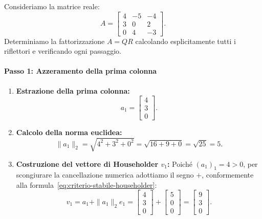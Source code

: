 \begin{example}
Consideriamo la matrice reale:
\begin{equation}
    A = \begin{bmatrix} 
    4 & -5 & -4 \\ 
    3 & 0 & 2 \\ 
    0 & 4 & -3 
    \end{bmatrix}.
\end{equation}
Determiniamo la fattorizzazione $A = QR$ calcolando esplicitamente tutti i riflettori e verificando ogni passaggio.

\paragraph{Passo 1: Azzeramento della prima colonna}
\begin{enumerate}
    \item \textbf{Estrazione della prima colonna:}
    \begin{equation}
        a_1 = \begin{bmatrix} 4 \\ 3 \\ 0 \end{bmatrix}.
    \end{equation}
    \item \textbf{Calcolo della norma euclidea:}
    \begin{equation}
        \|a_1\|_2 = \sqrt{4^2 + 3^2 + 0^2} = \sqrt{16 + 9 + 0} = \sqrt{25} = 5.
    \end{equation}
    \item \textbf{Costruzione del vettore di Householder $v_1$:}
    Poich\'e $(a_1)_1 = 4 > 0$, per scongiurare la cancellazione numerica adottiamo il segno $+$, conformemente alla formula~\eqref{eq:criterio-stabile-householder}:
    \begin{equation}
        v_1 = a_1 + \|a_1\|_2 e_1 = \begin{bmatrix} 4 \\ 3 \\ 0 \end{bmatrix} + \begin{bmatrix} 5 \\ 0 \\ 0 \end{bmatrix} = \begin{bmatrix} 9 \\ 3 \\ 0 \end{bmatrix}.

\end{equation}
\end{enumerate}
\end{example}
